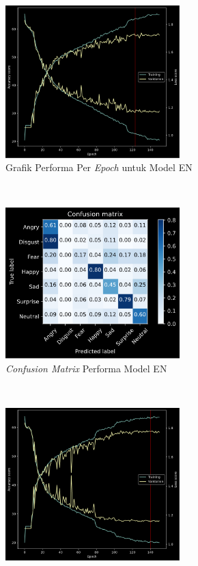 \begin{figure}[t]
    \centering
    \begin{subfigure}[t]{6.75cm}
        \includegraphics[width=6.75cm]{gambar/eksperimen4b1_grafik1.png}
        \caption{Grafik Performa Per \textit{Epoch} untuk Model EN}
        \label{fig:grafikeksperimen4b11}
    \end{subfigure}
    ~~~
    \begin{subfigure}[t]{6.75cm}
        \includegraphics[width=6.75cm]{gambar/eksperimen4b1_matriks1.png}
        \caption{\textit{Confusion Matrix} Performa Model EN}
        \label{fig:confusionmatrixeksperimen4b11}
    \end{subfigure}
    ~~~
    \begin{subfigure}[t]{6.75cm}
        \includegraphics[width=6.75cm]{gambar/eksperimen4b1_grafik2.png}

\end{subfigure}
\end{figure}
